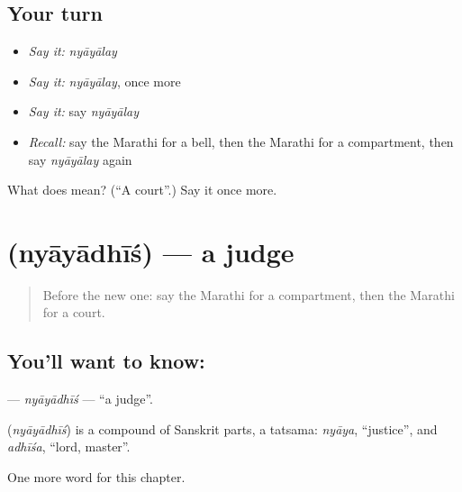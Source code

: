 \subsection*{Your turn}
\begin{itemize}
\raggedright
  \item \emph{Say it:} \emph{nyāyālay}
  \item \emph{Say it:} \emph{nyāyālay}, once more
  \item \emph{Say it:} say \emph{nyāyālay}
  \item \emph{Recall:} say the Marathi for a bell, then the Marathi for a compartment, then say \emph{nyāyālay} again
\end{itemize}

\begin{tcolorbox}[breakable,colback=teal!4,colframe=teal!35!black,title={Before you move on}]
What does  mean? (\textquotedblleft{}A court\textquotedblright{}.) Say it once more.
\end{tcolorbox}
\section[\texorpdfstring{\mr{न्यायाधीश} (nyāyādhīś)}{न्यायाधीश (nyāyādhīś)}]{ (nyāyādhīś) — a judge}

\label{lesson:MR-C179-nyayadhis}



\begin{quote}
Before the new one: say the Marathi for a compartment, then the Marathi for a court.
\end{quote}

\subsection*{You'll want to know: }
\textbf{} — \emph{nyāyādhīś} — \textquotedblleft{}a judge\textquotedblright{}.

\begin{cousinweb}
\textbf{} (\emph{nyāyādhīś}) is a compound of Sanskrit parts, a tatsama: \emph{nyāya}, \textquotedblleft{}justice\textquotedblright{}, and \emph{adhīśa}, \textquotedblleft{}lord, master\textquotedblright{}.
\end{cousinweb}

\begin{grammarlens}[title={What you've built}]
One more word for this chapter.
\end{grammarlens}

